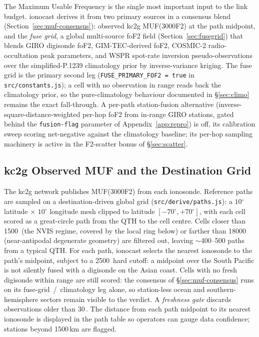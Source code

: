 \documentclass[11pt,a4paper]{article}
\newcommand{\SI}[2]{#1\,\text{#2}}
\newcommand{\km}{\text{km}}
\newcommand{\minute}{\text{min}}
\newcommand{\degree}{\ensuremath{{}^\circ}}
\begin{document}
The Maximum Usable Frequency is the single most important input to the
link budget.  ionocast derives it from two primary sources in a
consensus blend (Section~\ref{sec:muf-consensus}): observed kc2g
MUF(3000F2) at the path midpoint, and the \emph{fuse grid}, a
global multi-source foF2 field (Section~\ref{sec:fusegrid}) that
blends GIRO digisonde foF2, GIM-TEC-derived foF2, COSMIC-2
radio-occultation peak parameters, and WSPR spot-rate inversion
pseudo-observations over the simplified-P.1239 climatology prior
by inverse-variance kriging.  The fuse grid is the primary
second leg (\texttt{FUSE\_PRIMARY\_FOF2 = true}
in \texttt{src/constants.js}); a cell with no observation in
range reads back the climatology prior, so the pure-climatology
behaviour documented in \S\ref{sec:climo} remains the exact
fall-through.  A per-path station-fusion alternative
(inverse-square-distance-weighted per-hop foF2 from in-range GIRO
stations, gated behind the \texttt{fusion-flag} parameter of
Appendix~\ref{app:repro}) is off, its calibration sweep
scoring net-negative against the climatology baseline; its
per-hop sampling machinery is active in the F2-scatter bonus of
\S\ref{sec:scatter}.

\subsection{kc2g Observed MUF and the Destination Grid}\label{sec:kc2gobs}

The kc2g network publishes MUF(3000F2) from each ionosonde.
Reference paths are sampled on a destination-driven global grid
(\texttt{src/derive/paths.js}): a $10\degree$ latitude $\times$
$10\degree$ longitude mesh clipped to latitude
$[-70\degree, +70\degree]$, with each cell scored as a great-circle
path from the QTH to the cell centre.  Cells closer than
\SI{1500}{\km} (the NVIS regime, covered by the local ring below)
or farther than \SI{18000}{\km} (near-antipodal degenerate
geometry) are filtered out, leaving ${\sim}$400--500 paths from a
typical QTH.  For each path, ionocast selects the nearest
ionosonde to the path's
midpoint, subject to a \SI{2500}{\km} hard cutoff: a midpoint
over the South Pacific is not silently fused with a digisonde on
the Asian coast.  Cells with no fresh digisonde within range are
still scored: the consensus of \S\ref{sec:muf-consensus} runs on
its fuse-grid~/~climatology leg alone, so station-less ocean and
southern-hemisphere sectors remain visible to the
verdict.  A \emph{freshness gate} discards observations older than
\SI{30}{\minute}.  The distance from each path midpoint to its
nearest ionosonde is displayed in the path table so operators can
gauge data confidence; stations beyond 1500\,km are flagged.
\end{document}
